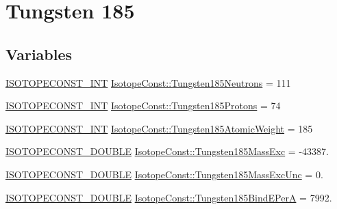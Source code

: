 \hypertarget{group___isotope_const-_tungsten-_w185}{}\section{Tungsten 185}
\label{group___isotope_const-_tungsten-_w185}
\subsection*{Variables}
\begin{DoxyCompactItemize}
\item 
\mbox{\hyperlink{group___isotope_const-_macros_ga5f18360b3e99483a35c32d789e62621c}{I\+S\+O\+T\+O\+P\+E\+C\+O\+N\+S\+T\+\_\+\+I\+NT}} \mbox{\hyperlink{group___isotope_const-_tungsten-_w185_gaecad0add48de662b859c3f3b74cb4bd0}{Isotope\+Const\+::\+Tungsten185\+Neutrons}} = 111
\item 
\mbox{\hyperlink{group___isotope_const-_macros_ga5f18360b3e99483a35c32d789e62621c}{I\+S\+O\+T\+O\+P\+E\+C\+O\+N\+S\+T\+\_\+\+I\+NT}} \mbox{\hyperlink{group___isotope_const-_tungsten-_w185_ga7fb53bc8a25b8db6e4c58388a621af2b}{Isotope\+Const\+::\+Tungsten185\+Protons}} = 74
\item 
\mbox{\hyperlink{group___isotope_const-_macros_ga5f18360b3e99483a35c32d789e62621c}{I\+S\+O\+T\+O\+P\+E\+C\+O\+N\+S\+T\+\_\+\+I\+NT}} \mbox{\hyperlink{group___isotope_const-_tungsten-_w185_gad9a054172667061a9890384566c07503}{Isotope\+Const\+::\+Tungsten185\+Atomic\+Weight}} = 185
\item 
\mbox{\hyperlink{group___isotope_const-_macros_ga8f45a7272ce02c0b4c65c44636ed719a}{I\+S\+O\+T\+O\+P\+E\+C\+O\+N\+S\+T\+\_\+\+D\+O\+U\+B\+LE}} \mbox{\hyperlink{group___isotope_const-_tungsten-_w185_ga801a974c76a0539544216f5d601c95cc}{Isotope\+Const\+::\+Tungsten185\+Mass\+Exc}} = -\/43387.
\item 
\mbox{\hyperlink{group___isotope_const-_macros_ga8f45a7272ce02c0b4c65c44636ed719a}{I\+S\+O\+T\+O\+P\+E\+C\+O\+N\+S\+T\+\_\+\+D\+O\+U\+B\+LE}} \mbox{\hyperlink{group___isotope_const-_tungsten-_w185_ga4f4c78f90391700939b9fd679bfc6f6e}{Isotope\+Const\+::\+Tungsten185\+Mass\+Exc\+Unc}} = 0.
\item 
\mbox{\hyperlink{group___isotope_const-_macros_ga8f45a7272ce02c0b4c65c44636ed719a}{I\+S\+O\+T\+O\+P\+E\+C\+O\+N\+S\+T\+\_\+\+D\+O\+U\+B\+LE}} \mbox{\hyperlink{group___isotope_const-_tungsten-_w185_ga62408d5f2bf188ec56e9ff52b5ad70c8}{Isotope\+Const\+::\+Tungsten185\+Bind\+E\+PerA}} = 7992.
\item 

\end{DoxyCompactItemize}
